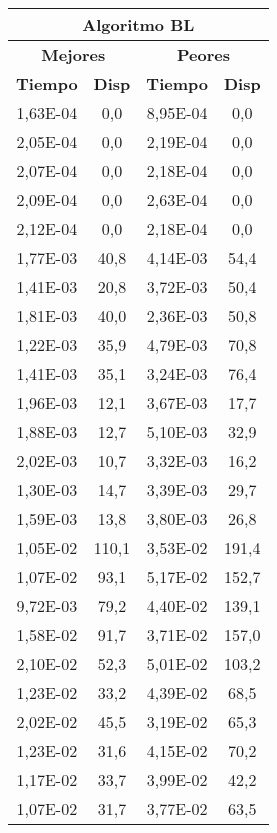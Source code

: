 \begin{figure}[h]
\begin{minipage}[r]{0.48\textwidth}
	    \begin{tabular}{|c|c|c|c|}
	        \hline
	        \multicolumn{4}{|c|}{\textbf{Algoritmo BL}} \\
	        \hline
	        \multicolumn{2}{|c|}{\textbf{Mejores}} & \multicolumn{2}{|c|}{\textbf{Peores}}\\
	        \hline
	        \textbf{Tiempo} & \textbf{Disp} & \textbf{Tiempo} & \textbf{Disp}\\
	        \hline
	        1,63E-04 & 0,0 & 8,95E-04 & 0,0\\
            2,05E-04 & 0,0 & 2,19E-04 & 0,0\\
            2,07E-04 & 0,0 & 2,18E-04 & 0,0\\
            2,09E-04 & 0,0 & 2,63E-04 & 0,0\\
            2,12E-04 & 0,0 & 2,18E-04 & 0,0\\
            1,77E-03 & 40,8 & 4,14E-03 & 54,4\\
            1,41E-03 & 20,8 & 3,72E-03 & 50,4\\
            1,81E-03 & 40,0 & 2,36E-03 & 50,8\\
            1,22E-03 & 35,9 & 4,79E-03 & 70,8\\
            1,41E-03 & 35,1 & 3,24E-03 & 76,4\\
            1,96E-03 & 12,1 & 3,67E-03 & 17,7\\
            1,88E-03 & 12,7 & 5,10E-03 & 32,9\\
            2,02E-03 & 10,7 & 3,32E-03 & 16,2\\
            1,30E-03 & 14,7 & 3,39E-03 & 29,7\\
            1,59E-03 & 13,8 & 3,80E-03 & 26,8\\
            1,05E-02 & 110,1 & 3,53E-02 & 191,4\\
            1,07E-02 & 93,1 & 5,17E-02 & 152,7\\
            9,72E-03 & 79,2 & 4,40E-02 & 139,1\\
            1,58E-02 & 91,7 & 3,71E-02 & 157,0\\
            2,10E-02 & 52,3 & 5,01E-02 & 103,2\\
            1,23E-02 & 33,2 & 4,39E-02 & 68,5\\
            2,02E-02 & 45,5 & 3,19E-02 & 65,3\\
            1,23E-02 & 31,6 & 4,15E-02 & 70,2\\
            1,17E-02 & 33,7 & 3,99E-02 & 42,2\\
            1,07E-02 & 31,7 & 3,77E-02 & 63,5\\

\end{tabular}
\end{minipage}
\end{figure}
